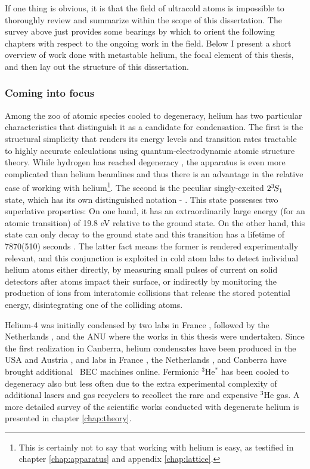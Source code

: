 	If one thing is obvious, it is that the field of ultracold atoms is impossible to thoroughly review and summarize within the scope of this dissertation. The survey above just provides some bearings by which to orient the following chapters with respect to the ongoing work in the field. Below I present a short overview of work done with metastable helium, the focal element of this thesis, and then lay out the structure of this dissertation.

		
\subsubsection*{Coming into focus} %

	
		
	Among the zoo of atomic species cooled to degeneracy, helium has two particular characteristics that distinguish it as a candidate for condensation. The first is the structural simplicity that renders its energy levels and transition rates tractable to highly accurate calculations using quantum-electrodynamic atomic structure theory. While hydrogen has reached degeneracy \cite{Fried98}, the apparatus is even more complicated than helium beamlines and thus there is an advantage in the relative ease of working with helium\footnote{This is certainly not to say that working with helium is easy, as testified in chapter \ref{chap:apparatus} and appendix \ref{chap:lattice}.}.
	The second is the peculiar singly-excited $2^{3\!} S_1$ state, which has its own distinguished notation - \mhe. 
	This state possesses two superlative properties: On one hand, it has an extraordinarily large energy (for an atomic transition) of 19.8 eV relative to the ground state. 
	On the other hand, this state can only decay to the ground state and this transition has a lifetime of 7870(510) seconds \cite{Hodgman09_mhe}. 
	The latter fact means the former is rendered experimentally relevant, and this conjunction is exploited in cold atom labs to detect individual helium atoms either directly, by measuring small pulses of current on solid detectors after atoms impact their surface, or indirectly by monitoring the production of ions from interatomic collisions that release the stored potential energy, disintegrating one of the colliding atoms. 

	Helium-4 was initially condensed by two labs in France \cite{Robert01,Santos01}, followed by the Netherlands \cite{Tychkov06}, and the ANU \cite{Dall07} where the works in this thesis were undertaken. Since the first realization in Canberra, helium condensates have been produced in the USA \cite{Doret09} and Austria \cite{Keller14}, and labs in France \cite{Bouton15}, the Netherlands \cite{Flores15}, and Canberra \cite{Abbas21} have brought additional \mhe~BEC machines online.
	Fermionic $^3$He$^*$ has been cooled to degeneracy also but less often due to the extra experimental complexity of additional lasers and gas recyclers to recollect the rare and expensive $^3$He gas.
	A more detailed survey of the scientific works conducted with degenerate helium is presented in chapter \ref{chap:theory}. 

